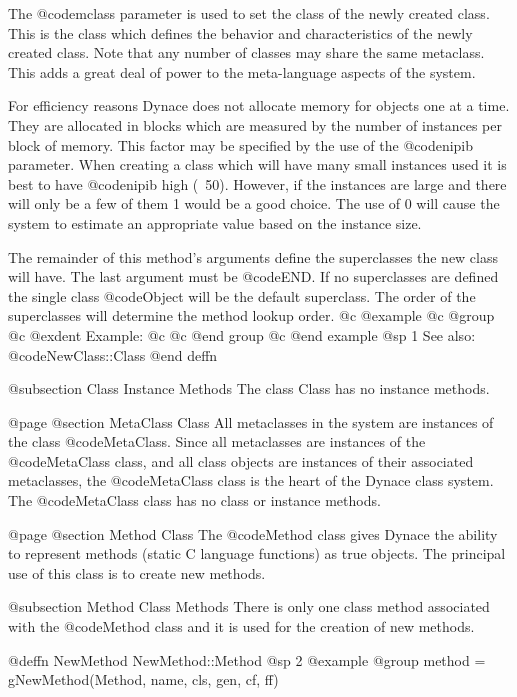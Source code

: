 The @code{mclass} parameter is used to set the class of the newly
created class.  This is the class which defines the behavior and
characteristics of the newly created class.  Note that any number
of classes may share the same metaclass.  This adds a great deal
of power to the meta-language aspects of the system.

For efficiency reasons Dynace does not allocate memory for objects
one at a time.  They are allocated in blocks which are measured
by the number of instances per block of memory.  This factor
may be specified by the use of the @code{nipib} parameter.  When
creating a class which will have many small instances used it
is best to have @code{nipib} high (~50).  However, if the instances
are large and there will only be a few of them 1 would be a good choice.
The use of 0 will cause the system to estimate an appropriate value
based on the instance size.

The remainder of this method's arguments define the superclasses the new
class will have.  The last argument must be @code{END}.  If no superclasses
are defined the single class @code{Object} will be the default
superclass.  The order of the superclasses will determine the method
lookup order.
@c @example
@c @group
@c @exdent Example:
@c 
@c @end group
@c @end example
@sp 1
See also:  @code{NewClass::Class}
@end deffn




@subsection Class Instance Methods
The class Class has no instance methods.


@page
@section MetaClass Class
All metaclasses in the system are instances of the class @code{MetaClass}.
Since all metaclasses are instances of the @code{MetaClass} class, and
all class objects are instances of their associated metaclasses, the
@code{MetaClass} class is the heart of the Dynace class system.  The
@code{MetaClass} class has no class or instance methods.



@page
@section Method Class
The @code{Method} class gives Dynace the ability to represent methods
(static C language functions) as true objects.  The principal use of this
class is to create new methods.


@subsection Method Class Methods
There is only one class method associated with the @code{Method} class and
it is used for the creation of new methods.




@deffn {NewMethod} NewMethod::Method
@sp 2
@example
@group
method = gNewMethod(Method, name, cls, gen, cf, ff)

